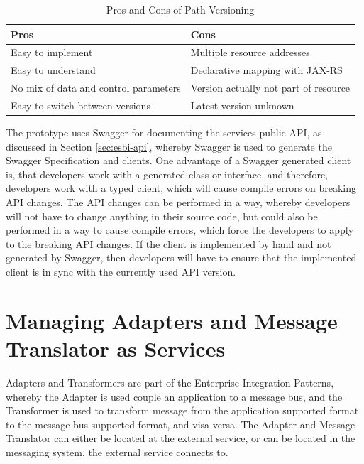 {\renewcommand{\arraystretch}{1.2}%
	\begin{table}[h]
		\begin{tabularx}{\textwidth}{ X|X }	
			\textbf{Pros}                         & \textbf{Cons}                         \\  \hline
			Easy to implement                     & Multiple resource addresses           \\
			Easy to understand                    & Declarative mapping with JAX-RS       \\  
			No mix of data and control parameters & Version actually not part of resource \\ \hline
			Easy to switch between versions       & Latest version unknown                \\ \hline
		\end{tabularx}
		\caption{Pros and Cons of Path Versioning}
		\label{tab:esbd-service-api-path}
\end{table}}

The prototype uses Swagger for documenting the services public API, as discussed in Section \vref{sec:esbi-api}, whereby Swagger is used to generate the Swagger Specification and clients. One advantage of a Swagger generated client is, that developers work with a generated class or interface, and therefore, developers work with a typed client, which will cause compile errors on breaking API changes. The API changes can be performed in a way, whereby developers will not have to change anything in their source code, but could also be performed in a way to cause compile errors, which force the developers to apply to the breaking API changes. If the client is implemented by hand and not generated by Swagger, then developers will have to ensure that the implemented client is in sync with the currently used API version.

\section{Managing Adapters and Message Translator as Services}
\label{sec:esbd-adap-trans-service}
Adapters and Transformers are part of the Enterprise Integration Patterns, whereby the Adapter is used couple an application to a message bus, and the Transformer is used to transform message from the application supported format to the message bus supported format, and visa versa. The Adapter and Message Translator can either be  located at the external service, or can be located in the messaging system, the external service connects to. \\

